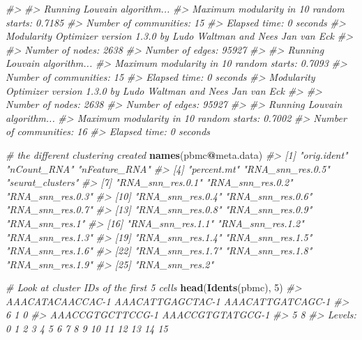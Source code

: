 \documentclass[
]{book}
\newenvironment{Shaded}{\begin{snugshade}}{\end{snugshade}}
\newcommand{\CommentTok}[1]{\textcolor[rgb]{0.56,0.35,0.01}{\textit{#1}}}
\newcommand{\DecValTok}[1]{\textcolor[rgb]{0.00,0.00,0.81}{#1}}
\newcommand{\FunctionTok}[1]{\textcolor[rgb]{0.13,0.29,0.53}{\textbf{#1}}}
\newcommand{\NormalTok}[1]{#1}
\newcommand{\SpecialCharTok}[1]{\textcolor[rgb]{0.81,0.36,0.00}{\textbf{#1}}}
\begin{document}
\begin{Shaded}
\begin{Highlighting}[]
\CommentTok{\#\textgreater{} }
\CommentTok{\#\textgreater{} Running Louvain algorithm...}
\CommentTok{\#\textgreater{} Maximum modularity in 10 random starts: 0.7185}
\CommentTok{\#\textgreater{} Number of communities: 15}
\CommentTok{\#\textgreater{} Elapsed time: 0 seconds}
\CommentTok{\#\textgreater{} Modularity Optimizer version 1.3.0 by Ludo Waltman and Nees Jan van Eck}
\CommentTok{\#\textgreater{} }
\CommentTok{\#\textgreater{} Number of nodes: 2638}
\CommentTok{\#\textgreater{} Number of edges: 95927}
\CommentTok{\#\textgreater{} }
\CommentTok{\#\textgreater{} Running Louvain algorithm...}
\CommentTok{\#\textgreater{} Maximum modularity in 10 random starts: 0.7093}
\CommentTok{\#\textgreater{} Number of communities: 15}
\CommentTok{\#\textgreater{} Elapsed time: 0 seconds}
\CommentTok{\#\textgreater{} Modularity Optimizer version 1.3.0 by Ludo Waltman and Nees Jan van Eck}
\CommentTok{\#\textgreater{} }
\CommentTok{\#\textgreater{} Number of nodes: 2638}
\CommentTok{\#\textgreater{} Number of edges: 95927}
\CommentTok{\#\textgreater{} }
\CommentTok{\#\textgreater{} Running Louvain algorithm...}
\CommentTok{\#\textgreater{} Maximum modularity in 10 random starts: 0.7002}
\CommentTok{\#\textgreater{} Number of communities: 16}
\CommentTok{\#\textgreater{} Elapsed time: 0 seconds}

\CommentTok{\# the different clustering created}
\FunctionTok{names}\NormalTok{(pbmc}\SpecialCharTok{@}\NormalTok{meta.data)}
\CommentTok{\#\textgreater{}  [1] "orig.ident"      "nCount\_RNA"      "nFeature\_RNA"   }
\CommentTok{\#\textgreater{}  [4] "percent.mt"      "RNA\_snn\_res.0.5" "seurat\_clusters"}
\CommentTok{\#\textgreater{}  [7] "RNA\_snn\_res.0.1" "RNA\_snn\_res.0.2" "RNA\_snn\_res.0.3"}
\CommentTok{\#\textgreater{} [10] "RNA\_snn\_res.0.4" "RNA\_snn\_res.0.6" "RNA\_snn\_res.0.7"}
\CommentTok{\#\textgreater{} [13] "RNA\_snn\_res.0.8" "RNA\_snn\_res.0.9" "RNA\_snn\_res.1"  }
\CommentTok{\#\textgreater{} [16] "RNA\_snn\_res.1.1" "RNA\_snn\_res.1.2" "RNA\_snn\_res.1.3"}
\CommentTok{\#\textgreater{} [19] "RNA\_snn\_res.1.4" "RNA\_snn\_res.1.5" "RNA\_snn\_res.1.6"}
\CommentTok{\#\textgreater{} [22] "RNA\_snn\_res.1.7" "RNA\_snn\_res.1.8" "RNA\_snn\_res.1.9"}
\CommentTok{\#\textgreater{} [25] "RNA\_snn\_res.2"}

\CommentTok{\# Look at cluster IDs of the first 5 cells}
\FunctionTok{head}\NormalTok{(}\FunctionTok{Idents}\NormalTok{(pbmc), }\DecValTok{5}\NormalTok{)}
\CommentTok{\#\textgreater{} AAACATACAACCAC{-}1 AAACATTGAGCTAC{-}1 AAACATTGATCAGC{-}1 }
\CommentTok{\#\textgreater{}                6                1                0 }
\CommentTok{\#\textgreater{} AAACCGTGCTTCCG{-}1 AAACCGTGTATGCG{-}1 }
\CommentTok{\#\textgreater{}                5                8 }
\CommentTok{\#\textgreater{} Levels: 0 1 2 3 4 5 6 7 8 9 10 11 12 13 14 15}
\end{Highlighting}
\end{Shaded}
\end{document}
